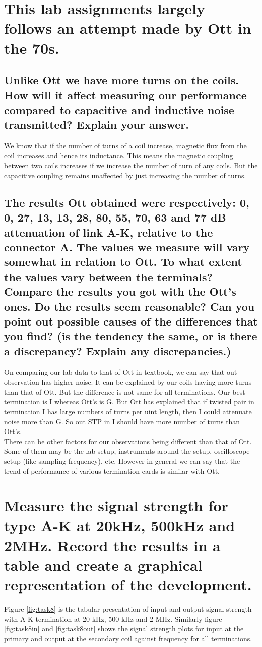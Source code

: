 \documentclass[12pt,a4paper,UKenglish]{article}
\begin{document}
\section{This lab assignments largely follows an attempt made by Ott in the 70s.}
\subsection{Unlike Ott we have more turns on the coils. How will it affect measuring our performance compared to capacitive and inductive noise transmitted? Explain your answer.}
We know that if the number of turns of a coil increase, magnetic flux from the coil increases and hence its inductance. This means the magnetic coupling between two coils increases if we increase the number of turn of any coils. But the capacitive coupling remains unaffected by just increasing the number of turns.
\subsection{ The results Ott obtained were respectively: 0, 0, 27, 13, 13, 28, 80, 55, 70, 63 and 77 dB attenuation of link A-K, relative to the connector A. The values we measure will vary somewhat in relation to Ott. To what extent the values vary between the terminals? Compare the results you got with the Ott's ones. Do the results seem reasonable? Can you point out possible causes of the differences that you find? (is the tendency the same, or is there a discrepancy? Explain any discrepancies.)}
On comparing our lab data to that of Ott in textbook, we can say that out observation has higher noise. It can be explained by our coils having more turns than that of Ott. But the difference is not same for all terminations. Our best termination is I whereas Ott's is G. But Ott has explained that if twisted pair in termination I has large numbers of turns per uint length, then I could attenuate noise more than G. So out STP in I should have more number of turns than Ott's. \\
There can be other factors for our observations being different than that of Ott. Some of them may be the lab setup, instruments around the setup, oscilloscope setup (like sampling frequency), etc. However in general we can say that the trend of performance of various termination cards is similar with Ott.

\section{Measure the signal strength for type A-K at 20kHz, 500kHz and 2MHz. Record the results in a table and create a graphical representation of the development.}
Figure \ref{fig:task8} is the tabular presentation of input and output signal strength with A-K termination at 20 kHz, 500 kHz and 2 MHz. Similarly figure  \ref{fig:task8in} and  \ref{fig:task8out} shows the signal strength plots for input at the primary and output at the secondary coil  against frequency for all terminations.
\end{document}
